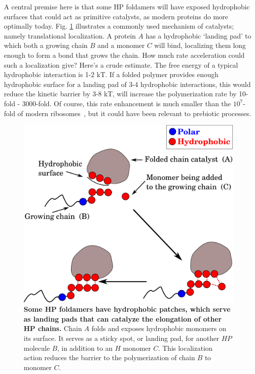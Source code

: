 \documentclass[5p,times]{elsarticle}
\begin{document}
 A central premise here is that some HP foldamers will have exposed hydrophobic surfaces that could 
act as primitive catalysts, as modern proteins do more optimally today.  Fig. \ref{fig:hp-catalysis} 
illustrates a commonly used mechanism of catalysts; namely translational localization.  A protein 
$A$ has a hydrophobic `landing pad' to which both a growing chain $B$ and a monomer $C$ will bind, 
localizing them long enough to form a bond that grows the chain.  How much rate acceleration could 
such a localization give?  Here's a crude estimate.  The free energy of a typical hydrophobic 
interaction is 1-2 kT.  If a folded polymer provides enough hydrophobic surface for a landing pad of 
3-4 hydrophobic interactions, this would reduce the kinetic barrier by 3-8 kT, will increase the 
polymerization rate by 10-fold - 3000-fold.  Of course, this rate enhancement is much smaller than 
the $10^7$-fold of modern ribosomes~\cite{Sievers2004a}, but it could have been relevant to 
prebiotic processes.
   \begin{figure}[h!]
  \centering
  \includegraphics[width=0.8\columnwidth]{pictures/hp-catalysis.pdf} 
  \caption{\footnotesize{\textbf{Some HP foldamers have hydrophobic patches, which serve as 
landing pads that can catalyze the elongation of other HP chains.}  Chain $A$ folds and exposes 
hydrophobic monomers on its surface.   It serves as a sticky spot, or landing pad, for another $HP$ 
molecule $B$, in addition to an $H$ monomer $C$.  This localization action reduces the barrier to 
the polymerization of chain $B$ to monomer $C$.}}
  \label{fig:hp-catalysis}
\end{figure} 
\end{document}
